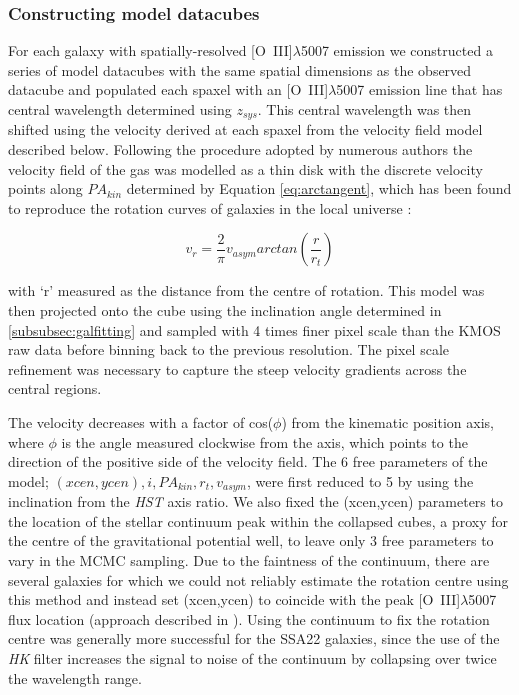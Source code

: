 \documentclass[fleqn,usenatbib]{mnras}
\begin{document}
\subsubsection{Constructing model datacubes}\label{subsubec:model_cube}
For each galaxy with spatially-resolved [O~{\sc III}]$\lambda$5007 emission we constructed a series of model datacubes with the same spatial dimensions as the observed datacube and populated each spaxel with an [O~{\sc III}]$\lambda$5007 emission line that has central wavelength determined using $z_{sys}$.
This central wavelength was then shifted using the velocity derived at each spaxel from the velocity field model described below.  
Following the procedure adopted by numerous authors \citep[e.g.][]{Epinat2010,Epinat2012,Swinbank2012,Stott2016,Mason2017} the velocity field of the gas was modelled as a thin disk with the discrete velocity points along $PA_{kin}$ determined by Equation \ref{eq:arctangent}, which has been found to reproduce the rotation curves of galaxies in the local universe \citep[e.g.][]{Courteau1997}:

\begin{equation}\label{eq:arctangent}
   v_{r} = \frac{2}{\pi}v_{asym}arctan\left(\frac{r}{r_{t}}\right)
\end{equation}

\noindent
with `r' measured as the distance from the centre of rotation.
This model was then projected onto the cube using the inclination angle determined in \cref{subsubsec:galfitting} and sampled with 4 times finer pixel scale than the KMOS raw data before binning back to the previous resolution.
The pixel scale refinement was necessary to capture the steep velocity gradients across the central regions.

The velocity decreases with a factor of cos($\phi$) from the kinematic position axis, where $\phi$ is the angle measured clockwise from the axis, which points to the direction of the positive side of the velocity field.
The 6 free parameters of the model; $(xcen, ycen), i, PA_{kin}, r_{t}, v_{asym}$, were first reduced to 5 by using the inclination from the {\em HST} axis ratio.
We also fixed the (xcen,ycen) parameters to the location of the stellar continuum peak within the collapsed cubes, a proxy for the centre of the gravitational potential well, to leave only 3 free parameters to vary in the MCMC sampling.
Due to the faintness of the continuum, there are several galaxies for which we could not reliably estimate the rotation centre using this method and instead set (xcen,ycen) to coincide with the peak [O~{\sc III}]$\lambda$5007 flux location (approach described in \citealt{Harrison2017}).
Using the continuum to fix the rotation centre was generally more successful for the SSA22 galaxies, since the use of the {\it HK} filter increases the signal to noise of the continuum by collapsing over twice the wavelength range. \\
\end{document}
